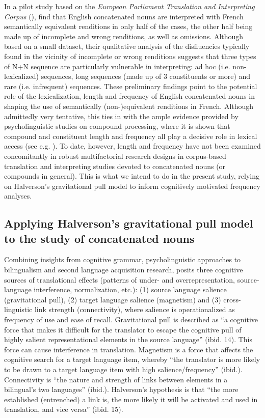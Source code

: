 \documentclass[output=paper]{langscibook}
\begin{document}
In a pilot study based on the \textit{European Parliament Translation and Interpreting Corpus} (\citealt{FerraresiBernardini2019}), \citet{LeferDeClerck2021} find that English concatenated nouns are interpreted with French semantically equivalent renditions in only half of the cases, the other half being made up of incomplete and wrong renditions, as well as omissions. Although based on a small dataset, their qualitative analysis of the disfluencies typically found in the vicinity of incomplete or wrong renditions suggests that three types of N+N sequence are particularly vulnerable in interpreting: ad hoc (i.e. non-lexicalized) sequences, long sequences (made up of 3 constituents or more) and rare (i.e. infrequent) sequences. These preliminary findings point to the potential role of the lexicalization, length and frequency of English concatenated nouns in shaping the use of semantically (non-)equivalent renditions in French. Although admittedly very tentative, this ties in with the ample evidence provided by psycholinguistic studies on compound processing, where it is shown that compound and constituent length and frequency all play a decisive role in lexical access (see e.g. \citealt{BaayenEtAl2010}). To date, however, length and frequency have not been examined concomitantly in robust multifactorial research designs in corpus-based translation and interpreting studies devoted to concatenated nouns (or compounds in general). This is what we intend to do in the present study, relying on Halverson’s gravitational pull model to inform cognitively motivated frequency analyses. 

\subsection{Applying Halverson’s gravitational pull model to the study of concatenated nouns}\label{sec:lefer:2.2}

Combining insights from cognitive grammar, psycholinguistic approaches to bilingualism and second language acquisition research, \citet{Halverson2017} posits three cognitive sources of translational effects (patterns of under- and overrepresentation, source-language interference, normalization, etc.): (1) source language salience (gravitational pull), (2) target language salience (magnetism) and (3) cross-linguistic link strength (connectivity), where salience is operationalized as frequency of use and ease of recall. Gravitational pull is described as “a cognitive force that makes it difficult for the translator to escape the cognitive pull of highly salient representational elements in the source language” (ibid. 14). This force can cause interference in translation. Magnetism is a force that affects the cognitive search for a target language item, whereby “the translator is more likely to be drawn to a target language item with high salience/frequency” (ibid.). Connectivity is “the nature and strength of links between elements in a bilingual’s two languages” (ibid.). Halverson’s hypothesis is that “the more established (entrenched) a link is, the more likely it will be activated and used in translation, and vice versa” (ibid. 15).
\end{document}

